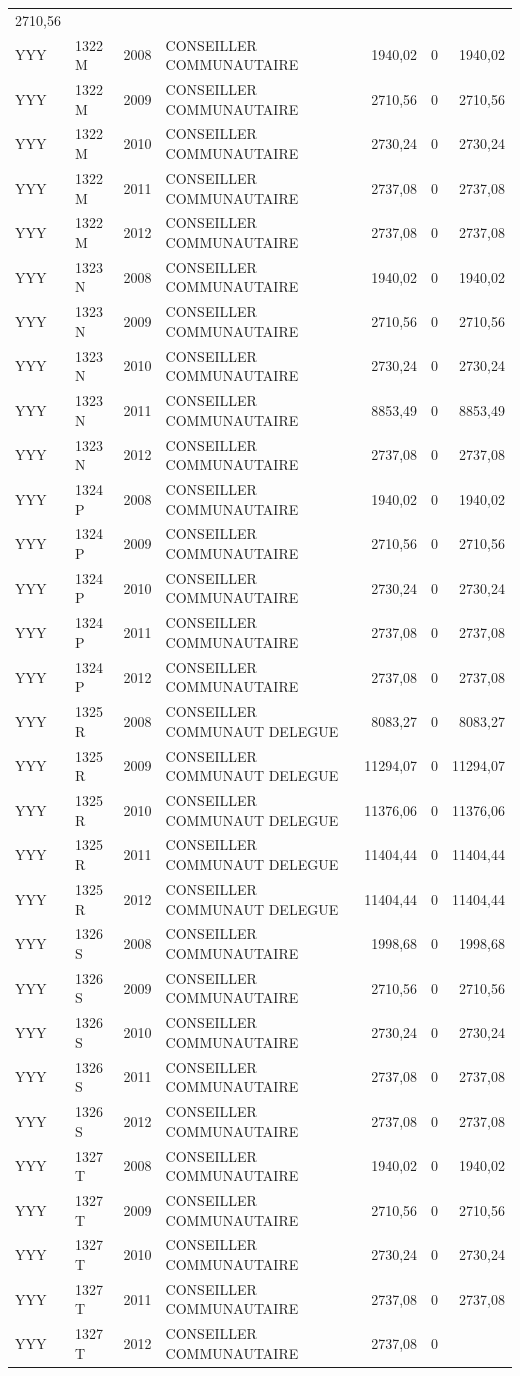 \begin{longtable}[]{@{}llrlrrr@{}}
2710,56\tabularnewline
YYY & 1322 M & 2008 & CONSEILLER COMMUNAUTAIRE & 1940,02 & 0 &
1940,02\tabularnewline
YYY & 1322 M & 2009 & CONSEILLER COMMUNAUTAIRE & 2710,56 & 0 &
2710,56\tabularnewline
YYY & 1322 M & 2010 & CONSEILLER COMMUNAUTAIRE & 2730,24 & 0 &
2730,24\tabularnewline
YYY & 1322 M & 2011 & CONSEILLER COMMUNAUTAIRE & 2737,08 & 0 &
2737,08\tabularnewline
YYY & 1322 M & 2012 & CONSEILLER COMMUNAUTAIRE & 2737,08 & 0 &
2737,08\tabularnewline
YYY & 1323 N & 2008 & CONSEILLER COMMUNAUTAIRE & 1940,02 & 0 &
1940,02\tabularnewline
YYY & 1323 N & 2009 & CONSEILLER COMMUNAUTAIRE & 2710,56 & 0 &
2710,56\tabularnewline
YYY & 1323 N & 2010 & CONSEILLER COMMUNAUTAIRE & 2730,24 & 0 &
2730,24\tabularnewline
YYY & 1323 N & 2011 & CONSEILLER COMMUNAUTAIRE & 8853,49 & 0 &
8853,49\tabularnewline
YYY & 1323 N & 2012 & CONSEILLER COMMUNAUTAIRE & 2737,08 & 0 &
2737,08\tabularnewline
YYY & 1324 P & 2008 & CONSEILLER COMMUNAUTAIRE & 1940,02 & 0 &
1940,02\tabularnewline
YYY & 1324 P & 2009 & CONSEILLER COMMUNAUTAIRE & 2710,56 & 0 &
2710,56\tabularnewline
YYY & 1324 P & 2010 & CONSEILLER COMMUNAUTAIRE & 2730,24 & 0 &
2730,24\tabularnewline
YYY & 1324 P & 2011 & CONSEILLER COMMUNAUTAIRE & 2737,08 & 0 &
2737,08\tabularnewline
YYY & 1324 P & 2012 & CONSEILLER COMMUNAUTAIRE & 2737,08 & 0 &
2737,08\tabularnewline
YYY & 1325 R & 2008 & CONSEILLER COMMUNAUT DELEGUE & 8083,27 & 0 &
8083,27\tabularnewline
YYY & 1325 R & 2009 & CONSEILLER COMMUNAUT DELEGUE & 11294,07 & 0 &
11294,07\tabularnewline
YYY & 1325 R & 2010 & CONSEILLER COMMUNAUT DELEGUE & 11376,06 & 0 &
11376,06\tabularnewline
YYY & 1325 R & 2011 & CONSEILLER COMMUNAUT DELEGUE & 11404,44 & 0 &
11404,44\tabularnewline
YYY & 1325 R & 2012 & CONSEILLER COMMUNAUT DELEGUE & 11404,44 & 0 &
11404,44\tabularnewline
YYY & 1326 S & 2008 & CONSEILLER COMMUNAUTAIRE & 1998,68 & 0 &
1998,68\tabularnewline
YYY & 1326 S & 2009 & CONSEILLER COMMUNAUTAIRE & 2710,56 & 0 &
2710,56\tabularnewline
YYY & 1326 S & 2010 & CONSEILLER COMMUNAUTAIRE & 2730,24 & 0 &
2730,24\tabularnewline
YYY & 1326 S & 2011 & CONSEILLER COMMUNAUTAIRE & 2737,08 & 0 &
2737,08\tabularnewline
YYY & 1326 S & 2012 & CONSEILLER COMMUNAUTAIRE & 2737,08 & 0 &
2737,08\tabularnewline
YYY & 1327 T & 2008 & CONSEILLER COMMUNAUTAIRE & 1940,02 & 0 &
1940,02\tabularnewline
YYY & 1327 T & 2009 & CONSEILLER COMMUNAUTAIRE & 2710,56 & 0 &
2710,56\tabularnewline
YYY & 1327 T & 2010 & CONSEILLER COMMUNAUTAIRE & 2730,24 & 0 &
2730,24\tabularnewline
YYY & 1327 T & 2011 & CONSEILLER COMMUNAUTAIRE & 2737,08 & 0 &
2737,08\tabularnewline
YYY & 1327 T & 2012 & CONSEILLER COMMUNAUTAIRE & 2737,08 & 0 &

\end{longtable}
